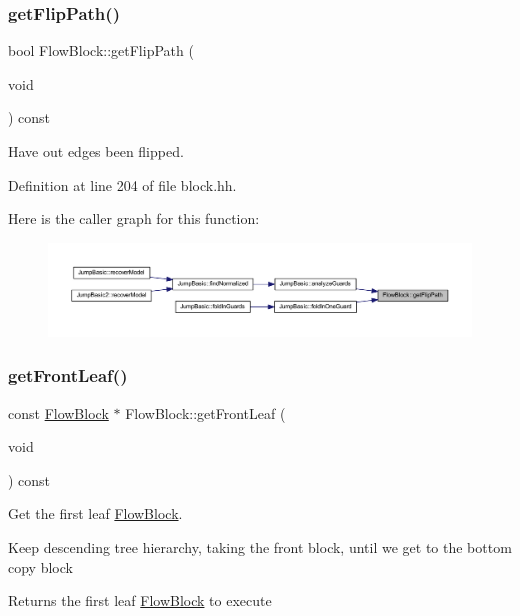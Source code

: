 \subsubsection{\texorpdfstring{getFlipPath()}{getFlipPath()}}
{\footnotesize\ttfamily bool Flow\+Block\+::get\+Flip\+Path (\begin{DoxyParamCaption}\item[{void}]{ }\end{DoxyParamCaption}) const\hspace{0.3cm}{\ttfamily [inline]}}



Have out edges been flipped. 



Definition at line 204 of file block.\+hh.

Here is the caller graph for this function\+:
\nopagebreak
\begin{figure}[H]
\begin{center}
\leavevmode
\includegraphics[width=350pt]{class_flow_block_a7b9cd8f7c7ead109b98d92d56fab80a1_icgraph}
\end{center}
\end{figure}
\mbox{\label{class_flow_block_af351e164076032e278a238cbb570710c}} 
\subsubsection{\texorpdfstring{getFrontLeaf()}{getFrontLeaf()}\hspace{0.1cm}{\footnotesize\ttfamily [1/2]}}
{\footnotesize\ttfamily const \mbox{\hyperlink{class_flow_block}{Flow\+Block}} $\ast$ Flow\+Block\+::get\+Front\+Leaf (\begin{DoxyParamCaption}\item[{void}]{ }\end{DoxyParamCaption}) const}



Get the first leaf \mbox{\hyperlink{class_flow_block}{Flow\+Block}}. 

Keep descending tree hierarchy, taking the front block, until we get to the bottom copy block \begin{DoxyReturn}{Returns}
the first leaf \mbox{\hyperlink{class_flow_block}{Flow\+Block}} to execute 
\end{DoxyReturn}


